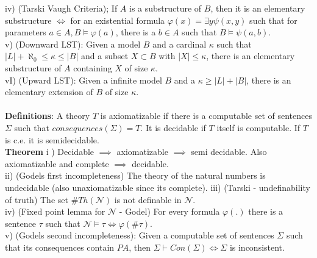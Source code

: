 \documentclass{article}
\begin{document}
	iv) (Tarski Vaugh Criteria); If $A$ is a substructure of $B$, then it is an elementary substructure $\iff$ for an existential formula $\varphi(x) = \exists y \psi(x,y)$ such that for parameters $a\in A, B \models \varphi(a)$, there is a $b \in A$ such that $B \models \psi(a,b)$.\\
	v) (Downward LST): Given a model $B$ and a cardinal $\kappa$ such that $|L| + \aleph_0 \leq \kappa \leq |B|$ and a subset $X \subset B$ with $|X| \leq \kappa$, there is an elementary substructure of $A$ containing $X$ of size $\kappa$.\\
	vI) (Upward LST): Given a infinite model $B$ and a $\kappa \geq |L| +|B|$, there is an elementary extension of $B$ of size $\kappa$.\\
	\\
	\textbf{Definitions}: A theory $T$ is axiomatizable if there is a computable set of sentences $\Sigma$ such that $consequences(\Sigma) = T$. It is decidable if $T$ itself is computable. If $T$ is c.e. it is semidecidable.
	\\
	\textbf{Theorem} i ) Decidable $\implies$ axiomatizable $\implies$ semi decidable. Also axiomatizable and complete $\implies $ decidable.\\
	ii) (Godels first incompleteness) The theory of the natural numbers is undecidable (also unaxiomatizable since its complete).
	iii) (Tarski - undefinability of truth) The set $\# Th(\mathcal{N})$ is not definable in $\mathcal{N}$.\\
	iv) (Fixed point lemma for $\mathcal{N}$ - Godel) For every formula $\varphi(.)$ there is a sentence $\tau$ such that $\mathcal{N} \models \tau \iff \varphi(\# \tau)$.\\
	v) (Godels second incompleteness): Given a computable set of sentences $\Sigma$ such that its consequences contain $PA$, then $\Sigma \vdash Con(\Sigma) \iff \Sigma$ is inconsistent.
\end{document}

